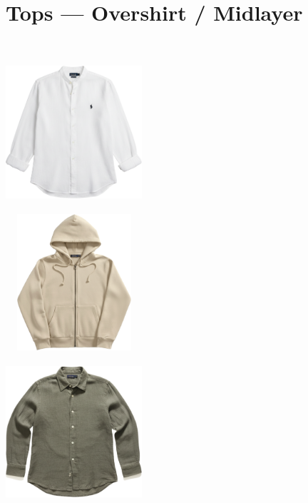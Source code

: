 \documentclass[10pt]{article}
\begin{document}
\section*{Tops — Overshirt / Midlayer}\
\vspace*{2mm}\noindent
\begin{minipage}[c][50.60mm][c]{50.60mm}\centering
\includegraphics[width=50.60mm,height=50.60mm,keepaspectratio]{assets/midlayer/button-up-white.png}\
\end{minipage} \hspace*{6.00mm} \begin{minipage}[c][50.60mm][c]{50.60mm}\centering
\includegraphics[width=50.60mm,height=50.60mm,keepaspectratio]{assets/midlayer/beige-zip-hoodie.png}\
\end{minipage} \hspace*{6.00mm} \begin{minipage}[c][50.60mm][c]{50.60mm}\centering
\includegraphics[width=50.60mm,height=50.60mm,keepaspectratio]{assets/midlayer/green-linen-button-up.png}\

\end{minipage}
\end{document}
